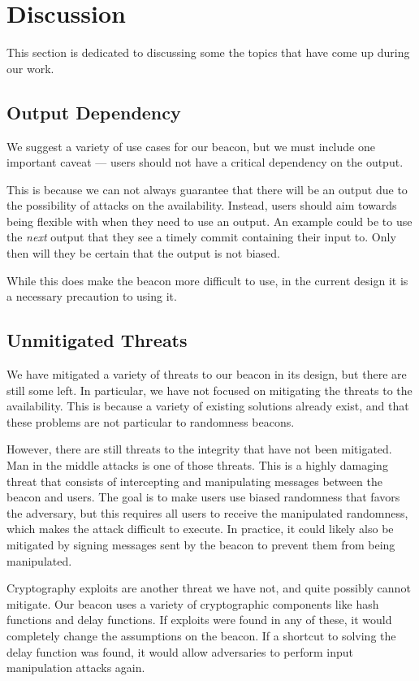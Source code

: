 \section{Discussion}%
\label{sec:discussion}
This section is dedicated to discussing some the topics that have come up during our work.

\subsection{Output Dependency}
We suggest a variety of use cases for our beacon, but we must include one important caveat --- users should not have a critical dependency on the output.

This is because we can not always guarantee that there will be an output due to the possibility of attacks on the availability.
Instead, users should aim towards being flexible with when they need to use an output.
An example could be to use the \textit{next} output that they see a timely commit containing their input to.
Only then will they be certain that the output is not biased.

While this does make the beacon more difficult to use, in the current design it is a necessary precaution to using it.

\subsection{Unmitigated Threats}
We have mitigated a variety of threats to our beacon in its design, but there are still some left.
In particular, we have not focused on mitigating the threats to the availability.
This is because a variety of existing solutions already exist, and that these problems are not particular to randomness beacons.

However, there are still threats to the integrity that have not been mitigated.
Man in the middle attacks is one of those threats.
This is a highly damaging threat that consists of intercepting and manipulating messages between the beacon and users.
The goal is to make users use biased randomness that favors the adversary, but this requires all users to receive the manipulated randomness, which makes the attack difficult to execute.
In practice, it could likely also be mitigated by signing messages sent by the beacon to prevent them from being manipulated.

Cryptography exploits are another threat we have not, and quite possibly cannot mitigate.
Our beacon uses a variety of cryptographic components like hash functions and delay functions.
If exploits were found in any of these, it would completely change the assumptions on the beacon.
If a shortcut to solving the delay function was found, it would allow adversaries to perform input manipulation attacks again.

